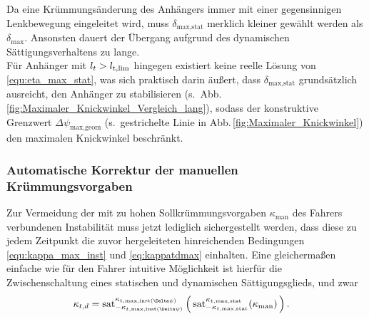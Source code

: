 Da eine Krümmungsänderung des Anhängers immer mit einer gegensinnigen Lenkbewegung eingeleitet wird, muss $\delta_{\text{max},\text{stat}}$ merklich kleiner gewählt werden als $\delta_{\text{max}}$. Ansonsten dauert der Übergang aufgrund des dynamischen Sättigungsverhaltens zu lange. \\ %
Für Anhänger mit $l_t > l_{\rm t,lim}$ hingegen existiert keine reelle Lösung von \eqref{equ:eta_max_stat}, was sich praktisch darin äußert, dass $\delta_{\text{max},\text{stat}}$ grundsätzlich ausreicht, den Anhänger zu stabilisieren (s.\ Abb.\,\ref{fig:Maximaler_Knickwinkel_Vergleich_lang}), sodass der konstruktive Grenzwert $\Delta\psi_\text{max,geom}$ (s.\ gestrichelte Linie in Abb.\,\ref{fig:Maximaler_Knickwinkel}) den maximalen Knickwinkel beschränkt.



\subsubsection{Automatische Korrektur der manuellen Krümmungsvorgaben}
Zur Vermeidung der mit zu hohen Sollkrümmungsvorgaben $\kappa_\text{man}$ des Fahrers verbundenen Instabilität muss jetzt lediglich sichergestellt werden, dass diese zu jedem Zeitpunkt die zuvor hergeleiteten hinreichenden Bedingungen \eqref{equ:kappa_max_inst} und \eqref{eq:kappatdmax}   einhalten. Eine gleichermaßen einfache wie für den Fahrer intuitive Möglichkeit ist hierfür die Zwischenschaltung eines statischen und  dynamischen Sättigungsglieds, und zwar
\newcommand{\sat}[2]{\text{sat}_{#1}^{#2}}
\begin{align}
	 \negspace \kappa_{t,d} = \sat{-\kappa_{t,\text{max,inst}(\Delta\psi)}}{\kappa_{t,\text{max,inst}(\Delta\psi)}} \left(\, \sat{-\kappa_{t,\text{max,stat}}}{\kappa_{t,\text{max,stat}}}(\kappa_\text{man})\,\right).
\end{align}

